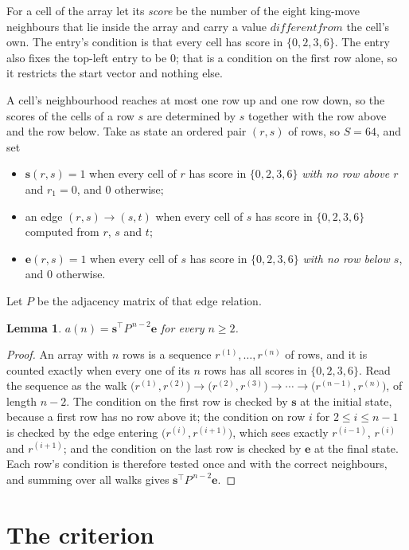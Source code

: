 \documentclass[11pt,a4paper]{article}
\theoremstyle{plain}
\newtheorem{lemma}[theorem]{Lemma}
\theoremstyle{definition}
\begin{document}
For a cell of the array let its \emph{score} be the number of the eight king-move neighbours that lie inside
the array and carry a value $different from$ the cell's own. The entry's condition is that every cell
has score in $\{0,2,3,6\}$. The entry also fixes the top-left entry to be $0$; that is a condition on the first row alone, so it restricts the start vector and nothing else.

A cell's neighbourhood reaches at most one row up and one row down, so the scores of the
cells of a row $s$ are determined by $s$ together with the row above and the row below.
Take as state an ordered pair $(r,s)$ of rows, so $S=64$, and set
\begin{itemize}
\item $\mathbf{s}(r,s)=1$ when every cell of $r$ has score in $\{0,2,3,6\}$ \emph{with no row
above $r$} and $r_1=0$, and $0$ otherwise;
\item an edge $(r,s)\to(s,t)$ when every cell of $s$ has score in $\{0,2,3,6\}$ computed from
$r$, $s$ and $t$;
\item $\mathbf{e}(r,s)=1$ when every cell of $s$ has score in $\{0,2,3,6\}$ \emph{with no row
below $s$}, and $0$ otherwise.
\end{itemize}
Let $P$ be the adjacency matrix of that edge relation.

\begin{lemma}\label{lem:walk}
$a(n)=\mathbf{s}^{\!\top}P^{\,n-2}\mathbf{e}$ for every $n\ge2$.
\end{lemma}

\begin{proof}
An array with $n$ rows is a sequence $r^{(1)},\dots,r^{(n)}$ of rows, and it is counted
exactly when every one of its $n$ rows has all scores in $\{0,2,3,6\}$. Read the sequence as the
walk $\bigl(r^{(1)},r^{(2)}\bigr)\to\bigl(r^{(2)},r^{(3)}\bigr)\to\cdots\to
\bigl(r^{(n-1)},r^{(n)}\bigr)$, of length $n-2$. The condition on the first row is
checked by $\mathbf{s}$ at the initial state, because a first row has no row above it; the
condition on row $i$ for $2\le i\le n-1$ is checked by the edge entering
$\bigl(r^{(i)},r^{(i+1)}\bigr)$, which sees exactly $r^{(i-1)}$, $r^{(i)}$ and
$r^{(i+1)}$; and the condition on the last row is checked by $\mathbf{e}$ at the final
state. Each row's condition is therefore tested once and with the correct neighbours, and
summing over all walks gives $\mathbf{s}^{\!\top}P^{\,n-2}\mathbf{e}$.
\end{proof}

\section{The criterion}
\end{document}
